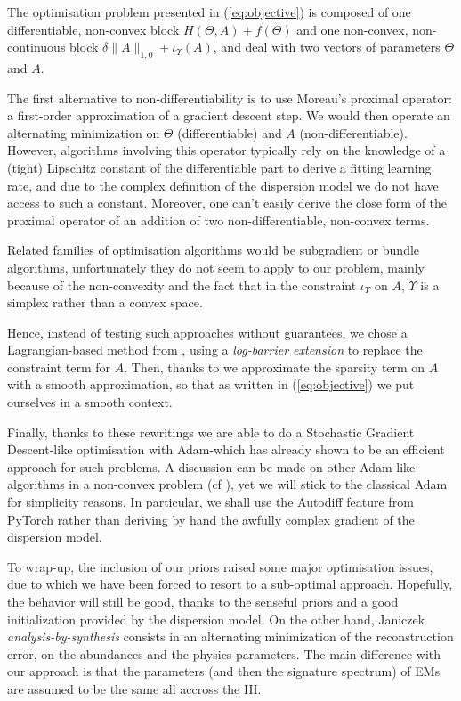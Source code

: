 \documentclass{article}
\begin{document}
The optimisation problem presented in (\ref{eq:objective}) is composed of one differentiable, non-convex block $H(\Theta, A) + f(\Theta)$ and one non-convex, non-continuous block $\delta\|A\|_{1,0} + \iota_\Upsilon (A)$, and deal with two vectors of parameters $\Theta$ and $A$.

The first alternative to non-differentiability is to use Moreau's proximal operator: a first-order approximation of a gradient descent step. We would then operate an alternating minimization on $\Theta$ (differentiable) and $A$ (non-differentiable). However, algorithms involving this operator typically rely on the knowledge of a (tight) Lipschitz constant of the differentiable part to derive a fitting learning rate, and due to the complex definition of the dispersion model we do not have access to such a constant. Moreover, one can't easily derive the close form of the proximal operator of an addition of two non-differentiable, non-convex terms.

Related families of optimisation algorithms would be subgradient or bundle algorithms, unfortunately they do not seem to apply to our problem, mainly because of the non-convexity and the fact that in the constraint $\iota_\Upsilon$ on $A$, $\Upsilon$ is a simplex rather than a convex space.

Hence, instead of testing such approaches without guarantees, we chose a Lagrangian-based method from \citet{kervadec_constrained_2020}, using a \emph{log-barrier extension} to replace the constraint term for $A$. Then, thanks to \citet{cherni_spoq_2020} we approximate the sparsity term on $A$ with a smooth approximation, so that as written in (\ref{eq:objective}) we put ourselves in a smooth context.

Finally, thanks to these rewritings we are able to do a Stochastic Gradient Descent-like optimisation with Adam-which has already shown to be an efficient approach for such problems. A discussion can be made on other Adam-like algorithms in a non-convex problem (cf \citet{chen_convergence_2019}), yet we will stick to the classical Adam for simplicity reasons. In particular, we shall use the Autodiff feature from PyTorch rather than deriving by hand the awfully complex gradient of the dispersion model.

To wrap-up, the inclusion of our priors raised some major optimisation issues, due to which we have been forced to resort to a sub-optimal approach. Hopefully, the behavior will still be good, thanks to the senseful priors and a good initialization provided by the dispersion model. On the other hand, Janiczek \emph{analysis-by-synthesis} consists in an alternating minimization of the reconstruction error, on the abundances and the physics parameters. The main difference with our approach is that the parameters (and then the signature spectrum) of EMs are assumed to be the same all accross the HI.
\end{document}
